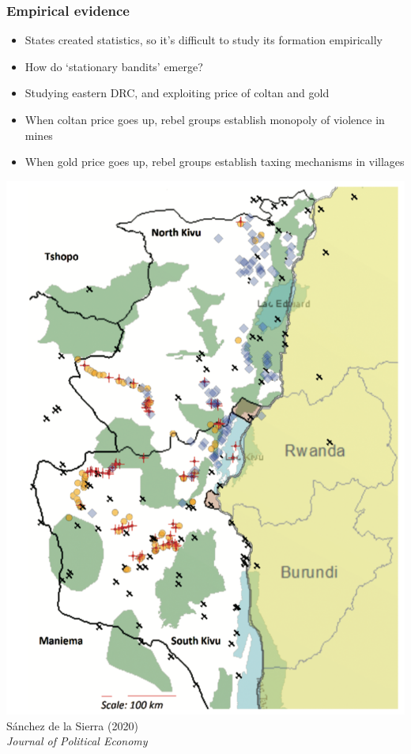 \documentclass[utf8, xcolor=dvipsnames, handout]{beamer}
\begin{document}
\begin{frame}
\frametitle{Empirical evidence}
\centering

\begin{minipage}{0.6\textwidth}\centering
  \begin{itemize}
    \item States created statistics, so it's difficult to study its formation empirically
    \item How do `stationary bandits' emerge?
    \item Studying eastern DRC, and exploiting price of coltan and gold
    \item When coltan price goes up, rebel groups establish monopoly of violence in mines
    \item When gold price goes up, rebel groups establish taxing mechanisms in villages
  \end{itemize}
\end{minipage}\hfill
\begin{minipage}{0.39\textwidth}\centering
  \includegraphics[width = \textwidth]{img/sanchez_de_la_sierra_sample}\\
  {\footnotesize Sánchez de la Sierra (2020)\\\textit{Journal of Political Economy}\\}
\end{minipage}

\end{frame}
\end{document}
